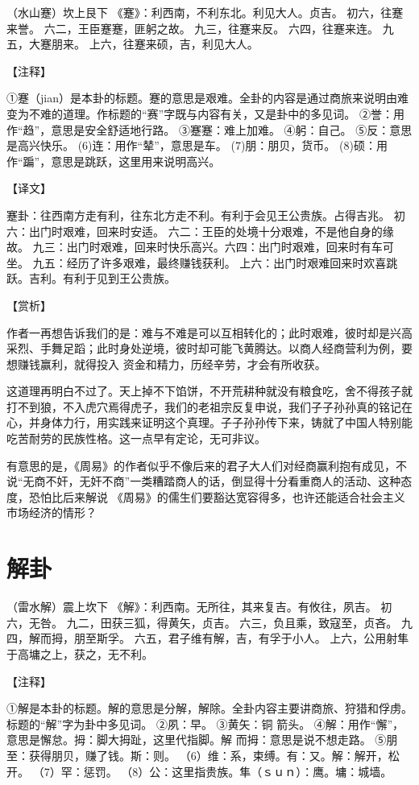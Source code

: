 \documentclass[12pt,UTF8]{ctexbook}
\begin{document}
（水山蹇）坎上艮下
《蹇》：利西南，不利东北。利见大人。贞吉。
初六，往蹇来誉。
六二，王臣蹇蹇，匪躬之故。
九三，往蹇来反。
六四，往蹇来连。
九五，大蹇朋来。
上六，往蹇来硕，吉，利见大人。

【注释】

①蹇（jian）是本卦的标题。蹇的意思是艰难。全卦的内容是通过商旅来说明由难变为不难的道理。作标题的“赛”字既与内容有关，又是卦中的多见词。
②誉：用作“趋”，意思是安全舒适地行路。
③蹇蹇：难上加难。
④躬：自己。
⑤反：意思是高兴快乐。
(6)连：用作“辇”，意思是车。
(7)朋：朋贝，货币。
(8)硕：用作“蹁”，意思是跳跃，这里用来说明高兴。

【译文】

蹇卦：往西南方走有利，往东北方走不利。有利于会见王公贵族。占得吉兆。
初六：出门时艰难，回来时安适。
六二：王臣的处境十分艰难，不是他自身的缘故。
九三：出门时艰难，回来时快乐高兴。六四：出门时艰难，回来时有车可坐。
九五：经历了许多艰难，最终赚钱获利。
上六：出门时艰难回来时欢喜跳跃。吉利。有利于见到王公贵族。

【赏析】

作者一再想告诉我们的是：难与不难是可以互相转化的；此时艰难，彼时却是兴高采烈、手舞足蹈；此时身处逆境，彼时却可能飞黄腾达。以商人经商营利为例，要想赚钱赢利，就得投入 资金和精力，历经辛劳，才会有所收获。

这道理再明白不过了。天上掉不下馅饼，不开荒耕种就没有粮食吃，舍不得孩子就打不到狼，不入虎穴焉得虎子，我们的老祖宗反复申说，我们子子孙孙真的铭记在心，并身体力行，用实践来证明这个真理。子子孙孙传下来，铸就了中国人特别能吃苦耐劳的民族性格。这一点早有定论，无可非议。

有意思的是，《周易》的作者似乎不像后来的君子大人们对经商赢利抱有成见，不说“无商不奸，无奸不商”一类糟踏商人的话，倒显得十分看重商人的活动、这种态度，恐怕比后来解说 《周易》的儒生们要豁达宽容得多，也许还能适合社会主义市场经济的情形？

\chapter{解卦}

（雷水解）震上坎下
《解》：利西南。无所往，其来复吉。有攸往，夙吉。
初六，无咎。
九二，田获三狐，得黄矢，贞吉。
六三，负且乘，致寇至，贞吝。
九四，解而拇，朋至斯孚。
六五，君子维有解，吉，有孚于小人。
上六，公用射隼于高墉之上，获之，无不利。

【注释】

①解是本卦的标题。解的意思是分解，解除。全卦内容主要讲商旅、狩猎和俘虏。标题的“解”字为卦中多见词。
②夙：早。
③黄矢：铜 箭头。
④解：用作“懈”，意思是懈怠。拇：脚大拇趾，这里代指脚。解 而拇：意思是说不想走路。
⑤朋至：获得朋贝，赚了钱。斯：则。
（6）维：系，束缚。有：又。解：解开，松开。
（7）罕：惩罚。
（8）公：这里指贵族。隼（ｓｕｎ）：鹰。墉：城墙。
\end{document}
